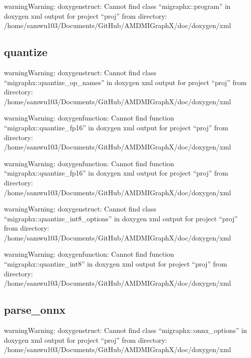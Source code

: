 \documentclass[letterpaper,10pt,english]{sphinxmanual}
\begin{document}
\begin{sphinxadmonition}{warning}{Warning:}
\sphinxAtStartPar
doxygenstruct: Cannot find class “migraphx::program” in doxygen xml output for project “proj” from directory: /home/samwu103/Documents/GitHub/AMDMIGraphX/doc/doxygen/xml
\end{sphinxadmonition}


\subsection{quantize}
\label{\detokenize{reference/cpp:quantize}}
\begin{sphinxadmonition}{warning}{Warning:}
\sphinxAtStartPar
doxygenstruct: Cannot find class “migraphx::quantize\_op\_names” in doxygen xml output for project “proj” from directory: /home/samwu103/Documents/GitHub/AMDMIGraphX/doc/doxygen/xml
\end{sphinxadmonition}

\begin{sphinxadmonition}{warning}{Warning:}
\sphinxAtStartPar
doxygenfunction: Cannot find function “migraphx::quantize\_fp16” in doxygen xml output for project “proj” from directory: /home/samwu103/Documents/GitHub/AMDMIGraphX/doc/doxygen/xml
\end{sphinxadmonition}

\begin{sphinxadmonition}{warning}{Warning:}
\sphinxAtStartPar
doxygenfunction: Cannot find function “migraphx::quantize\_fp16” in doxygen xml output for project “proj” from directory: /home/samwu103/Documents/GitHub/AMDMIGraphX/doc/doxygen/xml
\end{sphinxadmonition}

\begin{sphinxadmonition}{warning}{Warning:}
\sphinxAtStartPar
doxygenstruct: Cannot find class “migraphx::quantize\_int8\_options” in doxygen xml output for project “proj” from directory: /home/samwu103/Documents/GitHub/AMDMIGraphX/doc/doxygen/xml
\end{sphinxadmonition}

\begin{sphinxadmonition}{warning}{Warning:}
\sphinxAtStartPar
doxygenfunction: Cannot find function “migraphx::quantize\_int8” in doxygen xml output for project “proj” from directory: /home/samwu103/Documents/GitHub/AMDMIGraphX/doc/doxygen/xml
\end{sphinxadmonition}


\subsection{parse\_onnx}
\label{\detokenize{reference/cpp:parse-onnx}}
\begin{sphinxadmonition}{warning}{Warning:}
\sphinxAtStartPar
doxygenstruct: Cannot find class “migraphx::onnx\_options” in doxygen xml output for project “proj” from directory: /home/samwu103/Documents/GitHub/AMDMIGraphX/doc/doxygen/xml
\end{sphinxadmonition}
\end{document}
